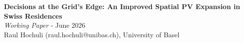 \documentclass[12PT, ]{article}
\begin{document}
\renewcommand{\thesection}{\arabic{section}}

\renewcommand{\figurename}{}
\renewcommand{\tablename}{}

\renewcommand\thefigure{\textcolor{NavyBlue}{Fig.\thesection.\arabic{figure}}}    
\renewcommand\thetable{\textcolor{NavyBlue}{Tab.\thesection.\arabic{table}}}
\renewcommand\theequation{\textcolor{NavyBlue}{Equ.\thesection.\arabic{equation}}}





\begin{minipage}{0.95\textwidth}
\begin{flushleft}
\LARGE
\textbf{Decisions at the Grid's Edge: An Improved Spatial PV Expansion in Swiss Residences}\\[1ex] 
\large
\textit{Working Paper} - June 2026 \\ %

Raul Hochuli (raul.hochuli@unibas.ch), University of Basel\\
\footnotesize
\end{flushleft}
\end{minipage}
\bigskip \bigskip
\end{document}
